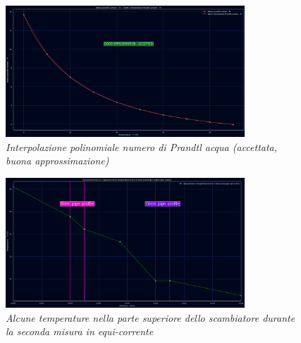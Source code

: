\documentclass[a4paper,10pt]{article}                                                                                       %
\begin{document}
\begin{figure}[H]                                                                                                           %
  \caption{\textit{Interpolazione polinomiale numero di Prandtl acqua (accettata, buona approssimazione)}}                  %
  \label{fig:water_intp_pr}                                                                                                 %
  \vspace{3mm}                                                                                                              %
  \centering                                                                                                                %
  \includegraphics[width=0.8\textwidth]{../final_doc/code_exports/imgs/water_intp_pr.png}                                   %
\end{figure}                                                                                                                %
\begin{figure}[H]                                                                                                           %
  \caption{\textit{Alcune temperature nella parte superiore dello scambiatore durante la seconda misura in equi-corrente}}  %
  \label{fig:temp_trend}                                                                                                    %
  \vspace{3mm}                                                                                                              %
  \centering                                                                                                                %
  \includegraphics[width=0.8\textwidth]{../final_doc/code_exports/imgs/temp_trend.png}                                      %
\end{figure}                                                                                                                %
\end{document}

